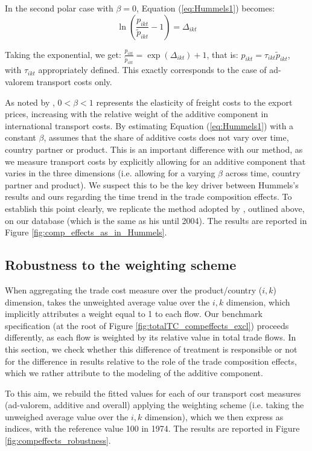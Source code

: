\documentclass[a4paper,11pt]{article}
\begin{document}
In the second polar case with $\beta = 0$, Equation (\ref{eq:Hummels1}) becomes:
$$\ln \left(\frac{p_{ikt}}{\widetilde{p}_{ikt}}-1\right) = \Delta_{ikt}$$

Taking the exponential, we get: $\frac{p_{ikt}}{\widetilde{p}_{ikt}}  = \exp (\Delta_{ikt})+1$, that is: $p_{ikt} = \tau_{ikt} \widetilde{p}_{ikt}$, with $\tau_{ikt}$ appropriately defined. This exactly corresponds to the case of ad-valorem transport costs only.


As noted by \cite{hummels_skiba}, $0<\beta<1$ represents the elasticity of freight costs to the export prices, increasing with the relative weight of the additive component in international transport costs.
By estimating Equation (\ref{eq:Hummels1}) with a constant $\beta$, \cite{hummels2007} assumes that the share of additive costs does not vary over time, country partner or product.
This is an important difference with our method, as we measure transport costs by explicitly allowing for an additive component that varies in the three dimensions (i.e. allowing for a varying $\beta$ across time, country partner and product). We suspect this to be the key driver between Hummels's results and ours regarding the time trend in the trade composition effects. To establish this point clearly, we replicate the method adopted by \cite{hummels2007}, outlined above, on our database (which is the same as his until 2004).
The results are reported in Figure \ref{fig:comp_effects_as_in_Hummels}.


\subsection{Robustness to the weighting scheme \label{app:compeffects_weights}}

When aggregating the trade cost measure over the product/country ($i,k$) dimension, \cite{hummels2007} takes the unweighted average value over the $i,k$ dimension, which implicitly attributes a weight equal to 1 to each flow.
Our benchmark specification  (at the root of Figure \ref{fig:totalTC_compeffects_excl}) proceeds differently, as each flow is weighted by its relative value in total trade flows. In this section, we check whether this difference of treatment is responsible or not for the difference in results relative to the role of the trade composition effects, which we rather attribute to the modeling of the additive component.

To this aim, we rebuild the fitted values for each of our transport cost measures (ad-valorem, additive and overall) applying the \cite{hummels2007} weighting scheme (i.e. taking the unweighed average value over the $i,k$ dimension), which we then express as indices, with the reference value 100 in 1974.
The results are reported in Figure \ref{fig:compeffects_robustness}.
\end{document}
